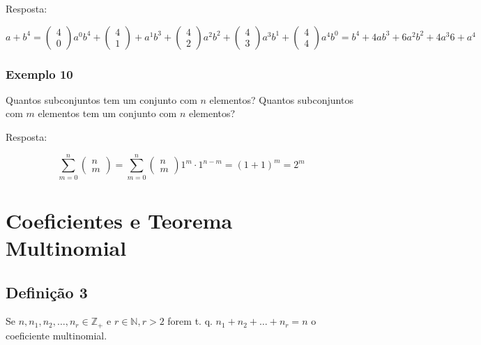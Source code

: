 \documentclass{article}
\begin{document}
	Resposta:
	
	$ a+b^{4} = \begin{pmatrix}
	4  \\
	0
	\end{pmatrix} a^{0} b^{4} + \begin{pmatrix}
	4  \\
	1
	\end{pmatrix} + a^{1} b^{3} + \begin{pmatrix}
	4  \\
	2
	\end{pmatrix} a^{2} b^{2} + \begin{pmatrix}
	4  \\
	3
	\end{pmatrix} a^{3} b^{1} + \begin{pmatrix}
	4  \\
	4
	\end{pmatrix} a^{4} b^{0} = b^{4} + 4ab^{3} + 6 a^{2} b^{2} + 4a^{3}6 + a^{4}$
	
	\subsubsection{Exemplo 10}
	
	\noindent Quantos subconjuntos tem um conjunto com $n$ elementos? Quantos subconjuntos com $m$ elementos tem um conjunto com $n$ elementos?
	
	Resposta:
	
	\begin{equation*}
	 \sum_{m=0}^{n} \begin{pmatrix}
	n  \\
	m
	\end{pmatrix} = \sum_{m=0}^{n} \begin{pmatrix}
	n  \\
	m
	\end{pmatrix} 1^{m} \cdot 1^{n-m} = (1+1)^{m} = 2^{m} 
	\end{equation*}
	
	\section{Coeficientes e Teorema Multinomial}
	
	\subsection{Definição 3}
	
	Se $ n, n_{1}, n_{2}, \dots, n_{r} \in \mathbb{Z}_{+}$ e $r \in \mathbb{N}, r > 2$ forem t. q. $n_{1} + n_{2} + \dots + n_{r} = n$ o coeficiente multinomial.
	
\end{document}
